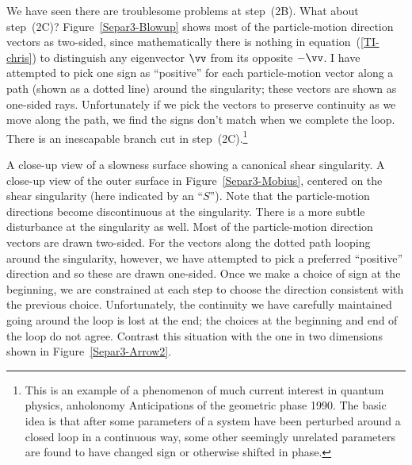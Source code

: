 We have seen there are troublesome problems at step~(2B).
What about step~(2C)? Figure~\ref{Separ3-Blowup} shows most of the particle-motion
direction vectors as two-sided, since mathematically there is nothing
in equation~(\ref{TI-chris}) to distinguish any eigenvector $\vv$
from its opposite $-\vv$. I have attempted to pick one sign
as ``positive'' for each particle-motion vector along a path
(shown as a dotted line) around the singularity;
these vectors are shown as one-sided rays.
Unfortunately if we pick the vectors to preserve
continuity as we move along the path, we find the signs don't match
when we complete the loop. There is an inescapable branch cut in
step~(2C).\footnote{This is an example of a phenomenon of much
current interest in quantum physics, anholonomy
{Anticipations of the geometric phase}
{1990}.
The basic idea is that after some parameters of a system have been
perturbed around a closed loop in a continuous way, some other
seemingly unrelated parameters are found to have changed sign or
otherwise shifted in phase.}

{A close-up view of a slowness surface showing a canonical shear singularity.}
{
A close-up view of the outer surface in Figure~\protect\ref{Separ3-Mobius},
centered on the shear singularity (here indicated by an ``{\bf $S$}'').
Note that the particle-motion directions become discontinuous at
the singularity.
There is a more subtle disturbance at the singularity as well.
Most of the particle-motion direction vectors are drawn two-sided.
For the vectors along the dotted path looping around the singularity,
however, we have attempted to pick a preferred ``positive'' direction and so
these are drawn one-sided.
Once we make a choice of sign at the beginning, we are constrained at each
step to choose the direction consistent with the previous choice.
Unfortunately, the continuity we have carefully maintained going around
the loop is lost at the end; the choices at the beginning and end of
the loop do not agree.
Contrast this situation with the one in two dimensions shown in
Figure~\protect\ref{Separ3-Arrow2}.
}

